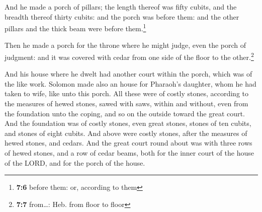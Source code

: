  And he made a porch of pillars; the length thereof was
fifty cubits, and the breadth thereof thirty cubits: and the porch was
before them: and the other pillars and the thick beam were before
them.\footnote{\textbf{7:6} before them: or, according to them}

 Then he made a porch for the throne where he might judge,
even the porch of judgment: and it was covered with cedar from one side
of the floor to the other.\footnote{\textbf{7:7} from\ldots: Heb. from
  floor to floor}

 And his house where he dwelt had another court within the
porch, which was of the like work. Solomon made also an house for
Pharaoh's daughter, whom he had taken to wife, like unto this porch.
 All these were of costly stones, according to the
measures of hewed stones, sawed with saws, within and without, even from
the foundation unto the coping, and so on the outside toward the great
court.  And the foundation was of costly stones, even
great stones, stones of ten cubits, and stones of eight cubits.
 And above were costly stones, after the measures of
hewed stones, and cedars.  And the great court round
about was with three rows of hewed stones, and a row of cedar beams,
both for the inner court of the house of the LORD, and for the porch of
the house.

